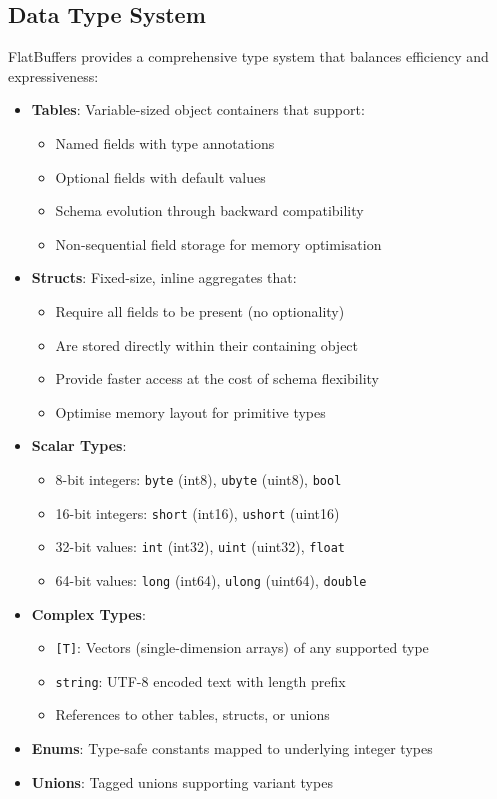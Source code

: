 \subsection{Data Type System}
\label{subsec:data_type_system}

FlatBuffers provides a comprehensive type system that balances efficiency and expressiveness:

\begin{itemize}
  \item \textbf{Tables}: Variable-sized object containers that support:
    \begin{itemize}
      \item Named fields with type annotations
      \item Optional fields with default values
      \item Schema evolution through backward compatibility
      \item Non-sequential field storage for memory optimisation
    \end{itemize}

  \item \textbf{Structs}: Fixed-size, inline aggregates that:
    \begin{itemize}
      \item Require all fields to be present (no optionality)
      \item Are stored directly within their containing object
      \item Provide faster access at the cost of schema flexibility
      \item Optimise memory layout for primitive types
    \end{itemize}

  \item \textbf{Scalar Types}:
    \begin{itemize}
      \item 8-bit integers: \texttt{byte} (int8), \texttt{ubyte} (uint8), \texttt{bool}
      \item 16-bit integers: \texttt{short} (int16), \texttt{ushort} (uint16)
      \item 32-bit values: \texttt{int} (int32), \texttt{uint} (uint32), \texttt{float}
      \item 64-bit values: \texttt{long} (int64), \texttt{ulong} (uint64), \texttt{double}
    \end{itemize}

  \item \textbf{Complex Types}:
    \begin{itemize}
      \item \texttt{[T]}: Vectors (single-dimension arrays) of any supported type
      \item \texttt{string}: UTF-8 encoded text with length prefix
      \item References to other tables, structs, or unions
    \end{itemize}

  \item \textbf{Enums}: Type-safe constants mapped to underlying integer types
  \item \textbf{Unions}: Tagged unions supporting variant types
\end{itemize}

